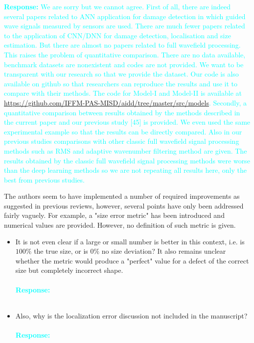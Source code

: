 \documentclass[11pt,a2paper]{report}
\begin{document}
	\textcolor{Cyan}{
		\textbf{Response:}
	We are sorry but we cannot agree. First of all, there are indeed several papers related to ANN application for damage detection in which guided wave signals measured by sensors are used. There are much fewer papers related to the application of CNN/DNN for damage detection, localisation and size estimation. But there are almost no papers related to full wavefield processing. This raises the problem of quantitative comparison. There are no data available, benchmark datasets are nonexistent and codes are not provided.
	We want to be transparent with our research so that we provide the dataset. Our code is also available on github so that researchers can reproduce the results and use it to compare with their methods. 
	The code for Model-I and Model-II is available at \url{https://github.com/IFFM-PAS-MISD/aidd/tree/master/src/models}.
	Secondly, a quantitative comparison between results obtained by the methods described in the current paper and our previous study [45] is provided. We even used the same experimental example so that the results can be directly compared. Also in our previous studies comparisons with other classic full wavefield signal processing methods such as RMS and adaptive wavenumber filtering method are given. The results obtained by the classic full wavefield signal processing methods were worse than the deep learning methods so we are not repeating all results here, only the best from previous studies.
	}

	\vspace{5mm}
	
	The authors seem to have implemented a number of required improvements as suggested in previous reviews, however, several points have only been addressed fairly vaguely. 
	For example, a "size error metric" has been introduced and numerical values are provided. 
	However, no definition of such metric is given. 
	\begin{itemize}
		\item It is not even clear if a large or small number is better in this context, i.e. is \(100\%\) the true size, or is \(0\%\) no size deviation? It also remains unclear whether the metric would produce a "perfect" value for a defect of the correct size but completely incorrect shape. 
			\\ \\
		\textcolor{Cyan}{
			\textbf{Response:}}
		\\ \\
		\item Also, why is the localization error discussion not included in the manuscript?
			\\ \\
		\textcolor{Cyan}{
			\textbf{Response:}}
		\\ \\
	\end{itemize}
	
\end{document}
